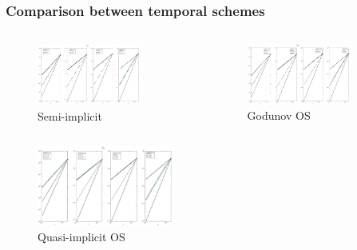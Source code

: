 \documentclass[8pt]{beamer}
\begin{document}
\begin{frame}
	\frametitle{Comparison between temporal schemes}
	\begin{columns}
		\begin{column}{0.5\textwidth}
			\begin{figure}[h]
				\includegraphics[width=0.8\textwidth]{D1_Vm_1.jpg} \caption{Semi-implicit}
			\end{figure}
		\end{column}
		\begin{column}{0.5\textwidth}
			\begin{figure}[h]
				\includegraphics[width=0.8\textwidth]{D1_Vm_1_GO.jpg} \caption{Godunov OS}
			\end{figure}
		\end{column}
	\end{columns}
    \vspace{-4mm}
    \begin{figure}[h]
    	\includegraphics[width=0.4\textwidth]{D1_Vm_1_OS.jpg} \caption{Quasi-implicit OS}
    \end{figure}
\end{frame}
\end{document}
